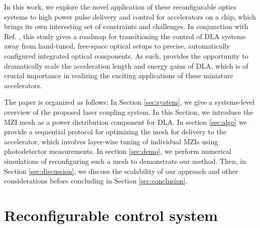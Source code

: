 \documentclass[%
 reprint,
 amsmath,amssymb,
 aps,
prstab,
floatfix,
]{revtex4-1}
\begin{document}
In this work, we explore the novel application of these reconfigurable optics systems to high power pulse delivery and control for accelerators on a chip, which brings its own interesting set of constraints and challenges.  In conjunction with Ref. \cite{hughes_-chip_2017}, this study gives a roadmap for transitioning the control of DLA systems away from hand-tuned, free-space optical setups to precise, automatically configured integrated optical components.  As such, provides the opportunity to dramatically scale the acceleration length and energy gains of DLA, which is of crucial importance in realizing the exciting applications of these miniature accelerators.

The paper is organized as follows: In Section \ref{sec:system}, we give a systems-level overview of the proposed laser coupling system.  In this Section, we introduce the MZI mesh as a power distribution component for DLA.  In section \ref{sec:algo} we provide a sequential protocol for optimizing the mesh for delivery to the accelerator, which involves layer-wise tuning of individual MZIs using photodetector measurements.  In section \ref{sec:demo}, we perform numerical simulations of reconfiguring such a mesh to demonstrate our method. Then, in Section \ref{sec:discussion}, we discuss the scalability of our approach and other considerations before concluding in Section \ref{sec:conclusion}.

\section{\label{sec:system}Reconfigurable control system}
\end{document}
